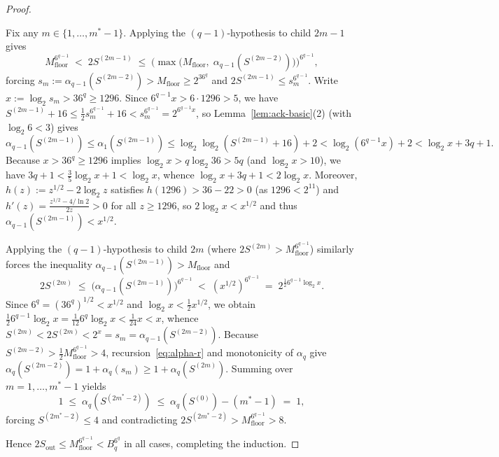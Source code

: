 \documentclass[11pt]{article}
\theoremstyle{definition}
\theoremstyle{remark}
\begin{document}
\begin{proof}
\begin{itemize}[leftmargin=2em]
  Fix any $m \in \{1, \dots, m^* - 1\}$. Applying the $(q - 1)$-hypothesis to child $2m - 1$ gives
  \[
  M_{\mathrm{floor}}^{6^{q-1}} \;<\; 2 S^{(2m-1)} \;\le\; \Big(\max\big(M_{\mathrm{floor}},\; \alpha_{q-1}(S^{(2m-2)})\big)\Big)^{6^{q-1}},
  \]
  forcing $s_m := \alpha_{q-1}(S^{(2m-2)}) > M_{\mathrm{floor}} \ge 2^{36^q}$ and $2 S^{(2m-1)} \le s_m^{6^{q-1}}$. Write $x := \log_2 s_m > 36^q \ge 1296$. Since $6^{q-1} x > 6 \cdot 1296 > 5$, we have $S^{(2m-1)} + 16 \le \frac{1}{2} s_m^{6^{q-1}} + 16 < s_m^{6^{q-1}} = 2^{6^{q-1} x}$, so Lemma~\ref{lem:ack-basic}(2) (with $\log_2 6 < 3$) gives
  \[
  \alpha_{q-1}(S^{(2m-1)}) \le \alpha_1(S^{(2m-1)}) \le \log_2\log_2(S^{(2m-1)} + 16) + 2 < \log_2(6^{q-1} x) + 2 < \log_2 x + 3q + 1.
  \]
  Because $x > 36^q \ge 1296$ implies $\log_2 x > q \log_2 36 > 5q$ (and $\log_2 x > 10$), we have $3q + 1 < \frac{3}{5}\log_2 x + 1 < \log_2 x$, whence $\log_2 x + 3q + 1 < 2 \log_2 x$. Moreover, $h(z) := z^{1/2} - 2\log_2 z$ satisfies $h(1296) > 36 - 22 > 0$ (as $1296 < 2^{11}$) and $h'(z) = \frac{z^{1/2} - 4/\ln 2}{2z} > 0$ for all $z \ge 1296$, so $2\log_2 x < x^{1/2}$ and thus $\alpha_{q-1}(S^{(2m-1)}) < x^{1/2}$.

  Applying the $(q - 1)$-hypothesis to child $2m$ (where $2 S^{(2m)} > M_{\mathrm{floor}}^{6^{q-1}}$) similarly forces the inequality $\alpha_{q-1}(S^{(2m-1)}) > M_{\mathrm{floor}}$ and
  \[
  2 S^{(2m)} \;\le\; \big(\alpha_{q-1}(S^{(2m-1)})\big)^{6^{q-1}} \;<\; (x^{1/2})^{6^{q-1}} \;=\; 2^{\frac{1}{2} 6^{q-1} \log_2 x}.
  \]
  Since $6^q = (36^q)^{1/2} < x^{1/2}$ and $\log_2 x < \frac{1}{2} x^{1/2}$, we obtain $\frac{1}{2} 6^{q-1} \log_2 x = \frac{1}{12} 6^q \log_2 x < \frac{1}{24} x < x$, whence $S^{(2m)} < 2 S^{(2m)} < 2^x = s_m = \alpha_{q-1}(S^{(2m-2)})$. Because $S^{(2m-2)} > \frac{1}{2} M_{\mathrm{floor}}^{6^{q-1}} > 4$, recursion~\eqref{eq:alpha-r} and monotonicity of $\alpha_q$ give $\alpha_q(S^{(2m-2)}) = 1 + \alpha_q(s_m) \ge 1 + \alpha_q(S^{(2m)})$. Summing over $m = 1, \dots, m^* - 1$ yields
  \[
  1 \;\le\; \alpha_q(S^{(2 m^* - 2)}) \;\le\; \alpha_q(S^{(0)}) - (m^* - 1) \;=\; 1,
  \]
  forcing $S^{(2 m^* - 2)} \le 4$ and contradicting $2 S^{(2 m^* - 2)} > M_{\mathrm{floor}}^{6^{q-1}} > 8$.
\end{itemize}
Hence $2 S_{\mathrm{out}} \le M_{\mathrm{floor}}^{6^{q-1}} < B_q^{6^q}$ in all cases, completing the induction.
\end{proof}
\end{document}

